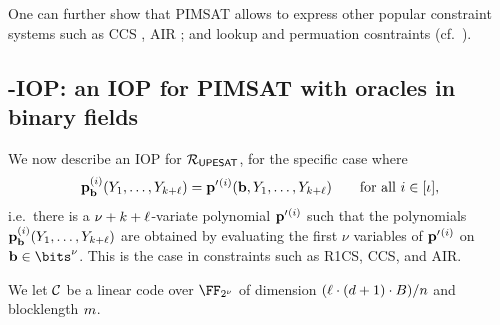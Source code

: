 \documentclass[11pt,letterpaper,usenames,dvipsnames]{article}
\begin{document}
One can further show that PIMSAT allows to express other popular constraint systems such as CCS \cite{?}, AIR \cite{?}; and lookup and permuation cosntraints (cf.\ \cite{zinc,zincplus}).



\subsection{\ftwoz-IOP: an IOP for PIMSAT with oracles in binary fields}

We now describe an IOP for $\mathcal{R}_{\mathsf{UPESAT}}$, for the specific case where $$\mathbf{p}_{\mathbf{b}}^{(i)}(Y_1, \ldots, Y_{k+\ell}) = \mathbf{p}'{}^{(i)}(\mathbf{b},Y_1, \ldots, Y_{k+\ell}) \qquad \text{for all } i\in [\iota],$$
i.e.\ there is a $\nu+k+\ell$-variate polynomial $\mathbf{p}'{}^{(i)}$ such that the polynomials $\mathbf{p}_{\mathbf{b}}^{(i)}(Y_1, \ldots, Y_{k+\ell})$ are obtained by evaluating the first $\nu$ variables of $\mathbf{p}'{}^{(i)}$ on $\bb\in \bits^\nu$.  This is the case in constraints such as R1CS, CCS, and AIR.


We let $\mathcal{C}$ be a linear code over $\comfield$ of dimension $(\ell\cdot(d+1)\cdot B)/n$ and blocklength $m$.
\end{document}
